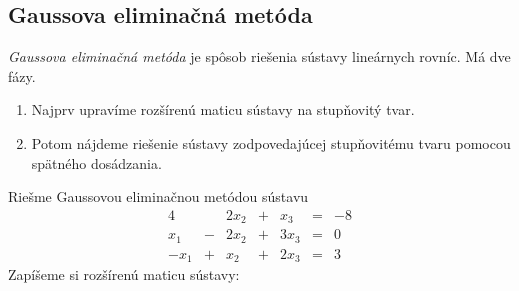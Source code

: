 \subsection{Gaussova eliminačná metóda}

\emph{Gaussova eliminačná metóda} je spôsob riešenia sústavy lineárnych rovníc. Má
dve fázy.
\begin{enumerate}
\item Najprv upravíme rozšírenú maticu sústavy na stupňovitý tvar.
\item Potom nájdeme riešenie sústavy zodpovedajúcej stupňovitému tvaru pomocou
spätného dosádzania.
\end{enumerate}
\begin{example}
Riešme Gaussovou eliminačnou metódou sústavu
\begin{alignat*}{4}
        &   & 2x_2 & + &  x_3 &= & -8 \\
     x_1 & - & 2x_2 & + & 3x_3 &= & 0 \\
    -x_1 & + &  x_2 & + & 2x_3 &= & 3
\end{alignat*}
Zapíšeme si rozšírenú maticu sústavy:


\end{example}

